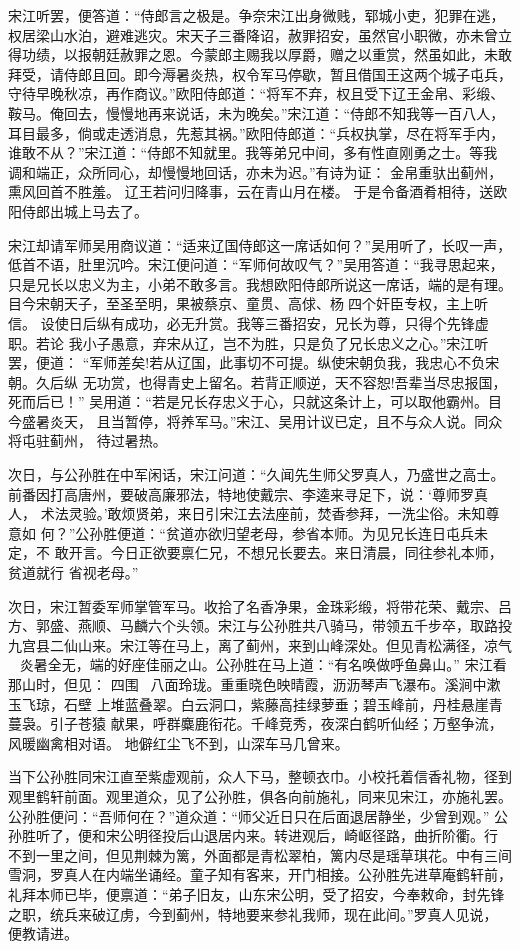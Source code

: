 宋江听罢，便答道：“侍郎言之极是。争奈宋江出身微贱，郓城小吏，犯罪在逃，
权居梁山水泊，避难逃灾。宋天子三番降诏，赦罪招安，虽然官小职微，亦未曾立
得功绩，以报朝廷赦罪之恩。今蒙郎主赐我以厚爵，赠之以重赏，然虽如此，未敢
拜受，请侍郎且回。即今溽暑炎热，权令军马停歇，暂且借国王这两个城子屯兵，
守待早晚秋凉，再作商议。”欧阳侍郎道：“将军不弃，权且受下辽王金帛、彩缎、
鞍马。俺回去，慢慢地再来说话，未为晚矣。”宋江道：“侍郎不知我等一百八人，
耳目最多，倘或走透消息，先惹其祸。”欧阳侍郎道：“兵权执掌，尽在将军手内，
谁敢不从？”宋江道：“侍郎不知就里。我等弟兄中间，多有性直刚勇之士。等我
调和端正，众所同心，却慢慢地回话，亦未为迟。”有诗为证：
金帛重驮出蓟州，熏风回首不胜羞。
辽王若问归降事，云在青山月在楼。
于是令备酒肴相待，送欧阳侍郎出城上马去了。

宋江却请军师吴用商议道：“适来辽国侍郎这一席话如何？”吴用听了，长叹一声，
低首不语，肚里沉吟。宋江便问道：“军师何故叹气？”吴用答道：“我寻思起来，
只是兄长以忠义为主，小弟不敢多言。我想欧阳侍郎所说这一席话，端的是有理。
目今宋朝天子，至圣至明，果被蔡京、童贯、高俅、杨四个奸臣专权，主上听信。
设使日后纵有成功，必无升赏。我等三番招安，兄长为尊，只得个先锋虚职。若论
我小子愚意，弃宋从辽，岂不为胜，只是负了兄长忠义之心。”宋江听罢，便道：
“军师差矣!若从辽国，此事切不可提。纵使宋朝负我，我忠心不负宋朝。久后纵
无功赏，也得青史上留名。若背正顺逆，天不容恕!吾辈当尽忠报国，死而后已！”
吴用道：“若是兄长存忠义于心，只就这条计上，可以取他霸州。目今盛暑炎天，
且当暂停，将养军马。”宋江、吴用计议已定，且不与众人说。同众将屯驻蓟州，
待过暑热。

次日，与公孙胜在中军闲话，宋江问道：“久闻先生师父罗真人，乃盛世之高士。
前番因打高唐州，要破高廉邪法，特地使戴宗、李逵来寻足下，说：‘尊师罗真人，
术法灵验。’敢烦贤弟，来日引宋江去法座前，焚香参拜，一洗尘俗。未知尊意如
何？”公孙胜便道：“贫道亦欲归望老母，参省本师。为见兄长连日屯兵未定，不
敢开言。今日正欲要禀仁兄，不想兄长要去。来日清晨，同往参礼本师，贫道就行
省视老母。”

次日，宋江暂委军师掌管军马。收拾了名香净果，金珠彩缎，将带花荣、戴宗、吕
方、郭盛、燕顺、马麟六个头领。宋江与公孙胜共八骑马，带领五千步卒，取路投
九宫县二仙山来。宋江等在马上，离了蓟州，来到山峰深处。但见青松满径，凉气
，炎暑全无，端的好座佳丽之山。公孙胜在马上道：“有名唤做呼鱼鼻山。”
宋江看那山时，但见：
四围，八面玲珑。重重晓色映晴霞，沥沥琴声飞瀑布。溪涧中漱玉飞琼，石壁
上堆蓝叠翠。白云洞口，紫藤高挂绿萝垂；碧玉峰前，丹桂悬崖青蔓袅。引子苍猿
献果，呼群麋鹿衔花。千峰竞秀，夜深白鹤听仙经；万壑争流，风暖幽禽相对语。
地僻红尘飞不到，山深车马几曾来。

当下公孙胜同宋江直至紫虚观前，众人下马，整顿衣巾。小校托着信香礼物，径到
观里鹤轩前面。观里道众，见了公孙胜，俱各向前施礼，同来见宋江，亦施礼罢。
公孙胜便问：“吾师何在？”道众道：“师父近日只在后面退居静坐，少曾到观。”
公孙胜听了，便和宋公明径投后山退居内来。转进观后，崎岖径路，曲折阶衢。行
不到一里之间，但见荆棘为篱，外面都是青松翠柏，篱内尽是瑶草琪花。中有三间
雪洞，罗真人在内端坐诵经。童子知有客来，开门相接。公孙胜先进草庵鹤轩前，
礼拜本师已毕，便禀道：“弟子旧友，山东宋公明，受了招安，今奉敕命，封先锋
之职，统兵来破辽虏，今到蓟州，特地要来参礼我师，现在此间。”罗真人见说，
便教请进。

